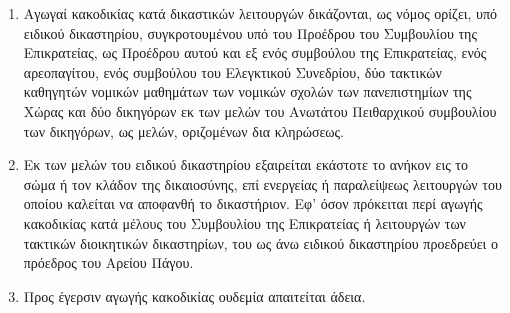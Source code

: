 \documentclass[twoside, a4paper, 10pt]{article}
\begin{document}
\begin{multicols}{2}
\begin{enumerate}
\begin{BigQuote}
\begin{enumerate}
  \item[1.] Αγωγαί κακοδικίας κατά δικαστικών λειτουργών δικάζονται, ως νόμος ορίζει, υπό ειδικού δικαστηρίου, συγκροτουμένου υπό του Προέδρου του Συμβουλίου της Επικρατείας, ως Προέδρου αυτού και εξ ενός συμβούλου της Επικρατείας, ενός αρεοπαγίτου, ενός συμβούλου του Ελεγκτικού Συνεδρίου, δύο τακτικών καθηγητών νομικών μαθημάτων των νομικών σχολών των πανεπιστημίων της Χώρας και δύο δικηγόρων εκ των μελών του Ανωτάτου Πειθαρχικού συμβουλίου των δικηγόρων, ως μελών, οριζομένων δια κληρώσεως.
  \item[2.] Εκ των μελών του ειδικού δικαστηρίου εξαιρείται εκάστοτε το ανήκον εις το σώμα ή τον κλάδον της δικαιοσύνης, επί ενεργείας ή παραλείψεως λειτουργών του οποίου καλείται να αποφανθή το δικαστήριον. Εφ' όσον πρόκειται  περί αγωγής κακοδικίας κατά μέλους του Συμβουλίου της Επικρατείας ή λειτουργών των τακτικών διοικητικών δικαστηρίων, του ως άνω ειδικού δικαστηρίου προεδρεύει ο πρόεδρος του Αρείου Πάγου.
  \item[3.] Προς έγερσιν αγωγής κακοδικίας ουδεμία απαιτείται άδεια.
\end{enumerate}


\end{BigQuote}
\end{enumerate}
\end{multicols}
\end{document}
